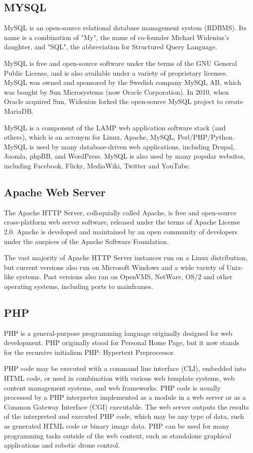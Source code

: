 \documentclass[12pt]{article}
\begin{document}
\subsection{MYSQL}
MySQL is an open-source relational database management system (RDBMS). Its name is a combination of "My", the name of co-founder Michael Widenius's daughter, and "SQL", the abbreviation for Structured Query Language.

MySQL is free and open-source software under the terms of the GNU General Public License, and is also available under a variety of proprietary licenses. MySQL was owned and sponsored by the Swedish company MySQL AB, which was bought by Sun Microsystems (now Oracle Corporation). In 2010, when Oracle acquired Sun, Widenius forked the open-source MySQL project to create MariaDB.

MySQL is a component of the LAMP web application software stack (and others), which is an acronym for Linux, Apache, MySQL, Perl/PHP/Python. MySQL is used by many database-driven web applications, including Drupal, Joomla, phpBB, and WordPress. MySQL is also used by many popular websites, including Facebook, Flickr, MediaWiki, Twitter and YouTube.

\subsection{Apache Web Server}
The Apache HTTP Server, colloquially called Apache, is free and open-source cross-platform web server software, released under the terms of Apache License 2.0. Apache is developed and maintained by an open community of developers under the auspices of the Apache Software Foundation.

The vast majority of Apache HTTP Server instances run on a Linux distribution, but current versions also run on Microsoft Windows and a wide variety of Unix-like systems. Past versions also ran on OpenVMS, NetWare, OS/2 and other operating systems, including ports to mainframes.

\subsection{PHP}
PHP is a general-purpose programming language originally designed for web development. PHP originally stood for Personal Home Page,
but it now stands for the recursive initialism PHP: Hypertext Preprocessor.

PHP code may be executed with a command line interface (CLI), embedded into HTML code, or used in combination with various web template systems, web content management systems, and web frameworks. PHP code is usually processed by a PHP interpreter implemented as a module in a web server or as a Common Gateway Interface (CGI) executable. The web server outputs the results of the interpreted and executed PHP code, which may be any type of data, such as generated HTML code or binary image data. PHP can be used for many programming tasks outside of the web context, such as standalone graphical applications and robotic drone control.
\end{document}
